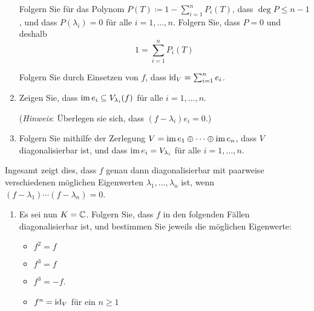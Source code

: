 \documentclass[a4paper,10pt]{scrartcl}
\begin{document}
\begin{question}
\begin{enumerate}[resume]
      Folgern Sie für das Polynom $P(T) \coloneqq 1 - \sum_{i=1}^n P_i(T)$, dass $\deg P \leq n-1$, und dass $P(\lambda_i) = 0$ für alle $i = 1, \dotsc, n$.
      Folgern Sie, dass $P = 0$ und deshalb
      \[
          1
        = \sum_{i=1}^n P_i(T)
      \]
      
      Folgern Sie durch Einsetzen von $f$, dass $\operatorname{id}_V = \sum_{i=1}^n e_i$.
    \item
      Zeigen Sie, dass $\operatorname{im} e_i \subseteq V_{\lambda_i}(f)$ für alle $i = 1, \dotsc, n$.
      
      (\emph{Hinweis}:
       Überlegen sie sich, dass $(f - \lambda_i) e_i = 0$.)
    \item
      Folgern Sie mithilfe der Zerlegung $V = \operatorname{im} e_1 \oplus \dotsb \oplus \operatorname{im} e_n$, dass $V$ diagonalisierbar ist, und dass $\operatorname{im} e_i = V_{\lambda_i}$ für alle $i = 1, \dotsc, n$.
  \end{enumerate}
  Ingesamt zeigt dies, dass $f$ genau dann diagonalisierbar mit paarweise verschiedenen möglichen Eigenwerten $\lambda_1, \dotsc, \lambda_n$ ist, wenn $(f - \lambda_1) \dotsm (f - \lambda_n) = 0$.
  \begin{enumerate}[resume]
    \item 
      Es sei nun $K = \mathbb{C}$.
      Folgern Sie, dass $f$ in den folgenden Fällen diagonalisierbar ist, und bestimmen Sie jeweils die möglichen Eigenwerte:
      \begin{itemize}
        \item
          $f^2 = f$
        \item
          $f^3 = f$
        \item
          $f^3 = -f$.
        \item
          $f^n = \operatorname{id}_V$ für ein $n \geq 1$
      \end{itemize}
  \end{enumerate}
\end{question}
\end{document}

